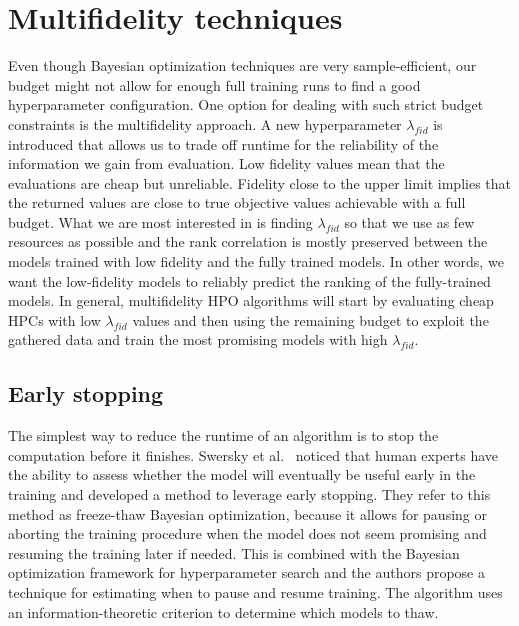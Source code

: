 \section{Multifidelity techniques}
Even though Bayesian optimization techniques are very sample-efficient, our budget might not allow for enough full training runs to find a good hyperparameter configuration. One option for dealing with such strict budget constraints is the multifidelity approach. A new hyperparameter $\lambda_{fid}$ is introduced that allows us to trade off runtime for the reliability of the information we gain from evaluation. Low fidelity values mean that the evaluations are cheap but unreliable. Fidelity close to the upper limit implies that the returned values are close to true objective values achievable with a full budget. What we are most interested in is finding $\lambda_{fid}$ so that we use as few resources as possible and the rank correlation is mostly preserved between the models trained with low fidelity and the fully trained models. In other words, we want the low-fidelity models to reliably predict the ranking of the fully-trained models. In general, multifidelity HPO algorithms will start by evaluating cheap HPCs with low $\lambda_{fid}$ values and then using the remaining budget to exploit the gathered data and train the most promising models with high $\lambda_{fid}$.


\subsection{Early stopping}
The simplest way to reduce the runtime of an algorithm is to stop the computation before it finishes. Swersky et al.~\cite{swersky2014freeze} noticed that human experts have the ability to assess whether the model will eventually be useful early in the training and developed a method to leverage early stopping. They refer to this method as freeze-thaw Bayesian optimization, because it allows for pausing or aborting the training procedure when the model does not seem promising and resuming the training later if needed. This is combined with the Bayesian optimization framework for hyperparameter search and the authors propose a technique for estimating when to pause and resume training. The algorithm uses an information-theoretic criterion to determine which models to thaw.

